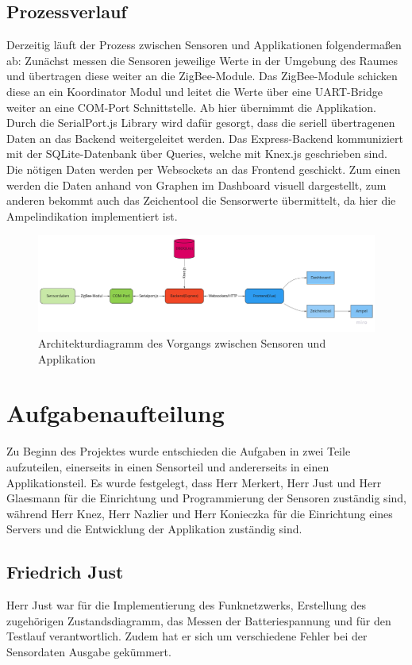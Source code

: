 \documentclass[]{article}
\begin{document}
	\subsection{Prozessverlauf}
	Derzeitig läuft der Prozess zwischen Sensoren und Applikationen folgendermaßen ab:\newline
	Zunächst messen die Sensoren jeweilige Werte in der Umgebung des Raumes und übertragen diese weiter an die ZigBee-Module. Das ZigBee-Module schicken diese an ein Koordinator Modul und leitet die Werte über eine UART-Bridge weiter an eine COM-Port Schnittstelle. Ab hier übernimmt die Applikation. Durch die SerialPort.js Library wird dafür gesorgt, dass die seriell übertragenen Daten an das Backend weitergeleitet werden. Das Express-Backend kommuniziert mit der SQLite-Datenbank über Queries, welche mit Knex.js geschrieben sind. Die nötigen Daten werden per Websockets an das Frontend geschickt. %
	Zum einen werden die Daten anhand von Graphen im Dashboard visuell dargestellt, zum anderen bekommt auch das Zeichentool die Sensorwerte übermittelt, da hier die Ampelindikation implementiert ist. 
	\begin{figure}[!h]
		\centering
		\includegraphics[scale=0.223]{images/DocArchitectureDiagram}
		\caption{Architekturdiagramm des Vorgangs zwischen Sensoren und Applikation}
		\label{img:DocArchitectureDiagram}
	\end{figure}
	\newpage
	\section{Aufgabenaufteilung} %
	Zu Beginn des Projektes wurde entschieden die Aufgaben in zwei Teile aufzuteilen, einerseits in einen Sensorteil und andererseits in einen Applikationsteil. Es wurde festgelegt, dass Herr Merkert, Herr Just und Herr Glaesmann für die Einrichtung und Programmierung der Sensoren zuständig sind, während Herr Knez, Herr Nazlier und Herr Konieczka für die Einrichtung eines Servers und die Entwicklung der Applikation zuständig sind. 
		\subsection{Friedrich Just} %
			Herr Just war für die Implementierung des Funknetzwerks, Erstellung des zugehörigen Zustandsdiagramm, das Messen der Batteriespannung und für den Testlauf verantwortlich. Zudem hat er sich um verschiedene Fehler bei der Sensordaten Ausgabe gekümmert.
\end{document}
